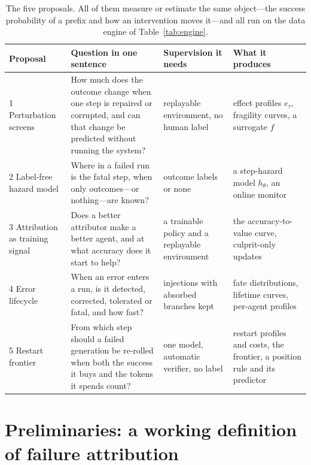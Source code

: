 \documentclass[10pt,a4paper]{article}
\begin{document}
\begin{table}[htbp]\centering\small
\begin{tabularx}{\linewidth}{@{}l >{\RaggedRight\hsize=1.35\hsize}X >{\RaggedRight\hsize=0.75\hsize}X >{\RaggedRight\hsize=0.9\hsize}X@{}}\toprule
Proposal & Question in one sentence & Supervision it needs & What it produces \\\midrule
1 Perturbation screens & How much does the outcome change when one step is repaired or corrupted, and can that change be predicted without running the system? & replayable environment, no human label & effect profiles $e_\tau$, fragility curves, a surrogate $f$ \\
2 Label-free hazard model & Where in a failed run is the fatal step, when only outcomes---or nothing---are known? & outcome labels or none & a step-hazard model $h_\theta$, an online monitor \\
3 Attribution as training signal & Does a better attributor make a better agent, and at what accuracy does it start to help? & a trainable policy and a replayable environment & the accuracy-to-value curve, culprit-only updates \\
4 Error lifecycle & When an error enters a run, is it detected, corrected, tolerated or fatal, and how fast? & injections with absorbed branches kept & fate distributions, lifetime curves, per-agent profiles \\
5 Restart frontier & From which step should a failed generation be re-rolled when both the success it buys and the tokens it spends count? & one model, automatic verifier, no label & restart profiles and costs, the frontier, a position rule and its predictor \\\bottomrule
\end{tabularx}
\caption{The five proposals. All of them measure or estimate the same object---the success probability of a prefix and how an intervention moves it---and all run on the data engine of Table~\ref{tab:engine}.}
\label{tab:roadmap}
\end{table}

\section{Preliminaries: a working definition of failure attribution}\label{sec:future:prelim}
\end{document}
